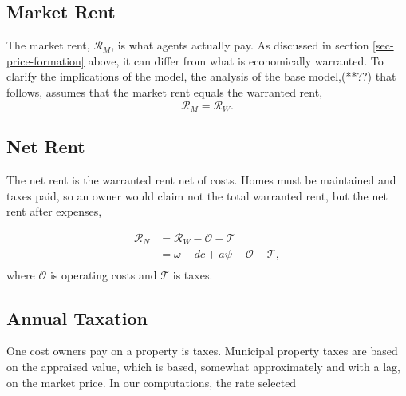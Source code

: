 \subsection{Market Rent}
The \gls{market rent}, $\mathcal{R}_M$, is what agents actually pay. As discussed in section \ref{sec-price-formation} above, it can differ from what is economically warranted. To clarify the implications of the model, the analysis of the base model,(**??) %
that follows, assumes that the market rent equals the warranted rent, %
\[\mathcal{R}_M = \mathcal{R}_W.\] 

\subsection{Net Rent}
The \gls{net rent} is the warranted rent net of costs. Homes must be maintained and taxes paid, so an owner would claim not the total warranted rent, but the net rent after expenses,

\begin{align}
\mathcal{R}_N &= \mathcal{R}_W - \mathcal{O} - \mathcal{T}\\
&= \omega - {dc} + a\psi -  \mathcal{O} - \mathcal{T}, \\
\end{align}
where $\mathcal{O}$ is operating costs and $\mathcal{T}$ is taxes. 


\subsection{Annual Taxation}

One cost owners pay on a property is taxes. Municipal property taxes are based on the \gls{appraised value}, which is based, somewhat approximately and with a lag, on the \gls{market price}. %
In our computations, the rate selected 

